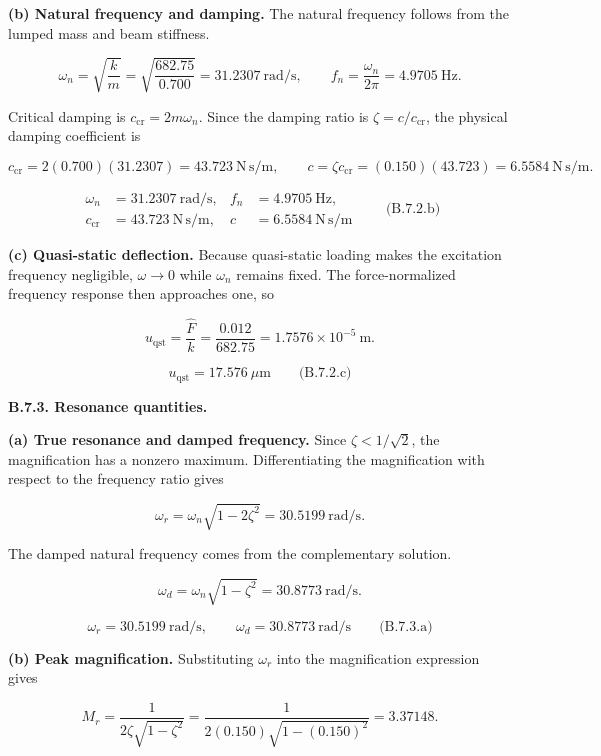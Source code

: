 \textbf{(b) Natural frequency and damping.} The natural frequency follows from the lumped mass and beam stiffness.

\[
\omega_n=\sqrt{\frac{k}{m}}
 =\sqrt{\frac{682.75}{0.700}}
 =31.2307\ \mathrm{rad/s},
\qquad
f_n=\frac{\omega_n}{2\pi}=4.9705\ \mathrm{Hz}.
\]

Critical damping is $c_{\mathrm{cr}}=2m\omega_n$. Since the damping ratio is $\zeta=c/c_{\mathrm{cr}}$, the physical damping coefficient is

\[
c_{\mathrm{cr}}=2(0.700)(31.2307)=43.723\ \mathrm{N\,s/m},
\qquad
c=\zeta c_{\mathrm{cr}}=(0.150)(43.723)=6.5584\ \mathrm{N\,s/m}.
\]

\[
\boxed{
\begin{aligned}
\omega_n&=31.2307\ \mathrm{rad/s},&
f_n&=4.9705\ \mathrm{Hz},\\
c_{\mathrm{cr}}&=43.723\ \mathrm{N\,s/m},&
c&=6.5584\ \mathrm{N\,s/m}
\end{aligned}}
\qquad\text{(B.7.2.b)}
\]

\textbf{(c) Quasi-static deflection.} Because quasi-static loading makes the excitation frequency negligible, $\omega\to0$ while $\omega_n$ remains fixed. The force-normalized frequency response then approaches one, so

\[
u_{\mathrm{qst}}=\frac{\hat F}{k}
 =\frac{0.012}{682.75}
 =1.7576\times10^{-5}\ \mathrm{m}.
\]

\[
\boxed{u_{\mathrm{qst}}=17.576\ \mu\mathrm{m}}
\qquad\text{(B.7.2.c)}
\]

\textbf{B.7.3. Resonance quantities.}

\textbf{(a) True resonance and damped frequency.} Since $\zeta<1/\sqrt{2}$, the magnification has a nonzero maximum. Differentiating the magnification with respect to the frequency ratio gives

\[
\omega_r=\omega_n\sqrt{1-2\zeta^2}
 =30.5199\ \mathrm{rad/s}.
\]

The damped natural frequency comes from the complementary solution.

\[
\omega_d=\omega_n\sqrt{1-\zeta^2}
 =30.8773\ \mathrm{rad/s}.
\]

\[
\boxed{\omega_r=30.5199\ \mathrm{rad/s},
\qquad
\omega_d=30.8773\ \mathrm{rad/s}}
\qquad\text{(B.7.3.a)}
\]

\textbf{(b) Peak magnification.} Substituting $\omega_r$ into the magnification expression gives

\[
M_r=\frac{1}{2\zeta\sqrt{1-\zeta^2}}
 =\frac{1}{2(0.150)\sqrt{1-(0.150)^2}}
 =3.37148.
\]

